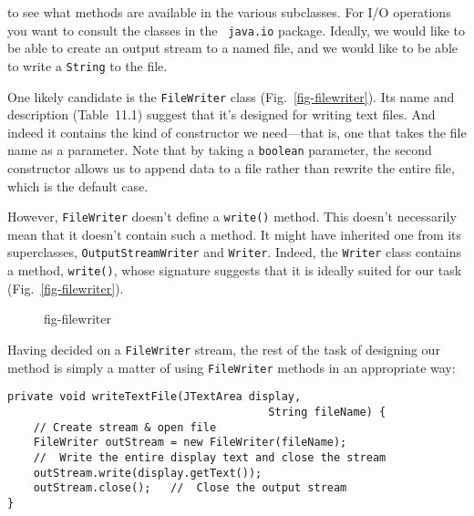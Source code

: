 
\noindent to see what methods are available in the various subclasses.
For I/O operations you want to consult the classes in the {\tt
java.io} package. Ideally, we would like to be able to create an
output stream to a named file, and we would like to be able to write a
{\tt String} to the file.

One likely candidate is the {\tt FileWriter} class
(Fig.~\ref{fig-filewriter}).  Its name and description
(Table~11.1) suggest that it's designed for writing text
files.  And indeed it contains the kind of constructor we need---that is, one 
that takes the file name as a parameter.  Note that by
taking a {\tt boolean} parameter, the second constructor allows us to
append data to a file rather than rewrite the entire file, which is
the default case.

However, {\tt FileWriter} doesn't define a {\tt write()}
method.  This doesn't necessarily mean that it doesn't contain such a
method.  It might have inherited one from its superclasses, 
{\tt OutputStream\-Writer} and {\tt Writer}.  Indeed, the {\tt Writer}
class contains a method, {\tt write()}, whose signature suggests that
it is ideally suited for our task (Fig.~\ref{fig-filewriter}).


\begin{figure}[tb]
 {fig-filewriter}
\end{figure}


Having decided on a {\tt FileWriter} stream, the rest of the
task of designing our method is simply a matter of using
{\tt FileWriter} methods in an appropriate way:

\begin{jjjlisting}
\begin{lstlisting}
private void writeTextFile(JTextArea display,
                                        String fileName) {
    // Create stream & open file
    FileWriter outStream = new FileWriter(fileName); 
    //  Write the entire display text and close the stream
    outStream.write(display.getText());              
    outStream.close();   //  Close the output stream
}
\end{lstlisting}
\end{jjjlisting}


